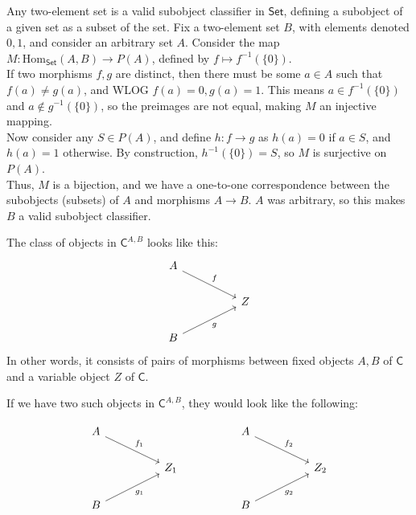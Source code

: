 \exercise Any two-element set is a valid subobject classifier in $\textsf{Set}$, defining a subobject of a given set as a subset of the set. Fix a two-element set $B$, with elements denoted $0,1$, and consider an arbitrary set $A$. Consider the map $M: \text{Hom}_{\textsf{Set}}(A,B) \to P(A)$, defined by $f \mapsto f^{-1}(\{0\})$.\\

If two morphisms $f, g$ are distinct, then there must be some $a \in A$ such that $f(a) \neq g(a)$, and WLOG $f(a) = 0, g(a) = 1$. This means $a \in f^{-1}(\{0\})$ and $a \notin g^{-1}(\{0\})$, so the preimages are not equal, making $M$ an injective mapping. \\

Now consider any $S \in P(A)$, and define $h:f \to g$ as $h(a) = 0$ if $a \in S$, and $h(a) = 1$ otherwise. By construction, $h^{-1}(\{0\}) = S$, so $M$ is surjective on $P(A)$. \\

Thus, $M$ is a bijection, and we have a one-to-one correspondence between the subobjects (subsets) of $A$ and morphisms $A \to B$. $A$ was arbitrary, so this makes $B$ a valid subobject classifier.

\exercise


The class of objects in $\textsf{C}^{A,B}$ looks like this:
\[\begin{tikzcd}
	A \\
	&& Z \\
	B
	\arrow["f", from=1-1, to=2-3]
	\arrow["g"', from=3-1, to=2-3]
\end{tikzcd}\]
In other words, it consists of pairs of morphisms between fixed objects $A, B$ of $\textsf{C}$ and a variable object $Z$ of $\textsf{C}$.

If we have two such objects in $\textsf{C}^{A,B}$, they would look like the following:

\[\begin{tikzcd}
	A &&&& A \\
	&& {Z_1} &&&& {Z_2} \\
	B &&&& B
	\arrow["{f_1}", from=1-1, to=2-3]
	\arrow["{f_2}", from=1-5, to=2-7]
	\arrow["{g_1}"', from=3-1, to=2-3]
	\arrow["{g_2}"', from=3-5, to=2-7]
\end{tikzcd}\]

